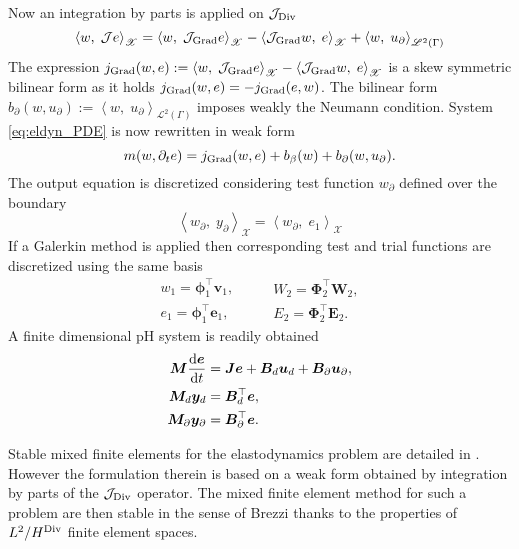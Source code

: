 Now an integration by parts is applied on $\mathcal{J}_{\operatorname*{Div}}$
\begin{equation}
\left\langle w, \; \mathcal{J} e \right\rangle_{\mathscr{X}} = \left\langle w, \; \mathcal{J}_{\operatorname*{Grad}} e \right\rangle_{\mathscr{X}} - \left\langle \mathcal{J}_{\operatorname*{Grad}} w, \; e \right\rangle_{\mathscr{X}} + \left\langle w, \; u_\partial \right\rangle_{\mathscr{L}^2(\Gamma)}
\end{equation}
The expression $j_{\operatorname*{Grad}}(w, e) :=\left\langle w, \; \mathcal{J}_{\operatorname*{Grad}} e \right\rangle_{\mathscr{X}} - \left\langle \mathcal{J}_{\operatorname*{Grad}} w, \; e \right\rangle_{\mathscr{X}}$ is a skew symmetric bilinear form as it holds $j_{\operatorname*{Grad}}(w, e)=-j_{\operatorname*{Grad}}(e, w)$. The bilinear form $b_{\partial}(w, u_\partial) := \left\langle w, \; u_\partial \right\rangle_{\mathscr{L}^2(\Gamma)}$ imposes weakly the Neumann condition. System \eqref{eq:eldyn_PDE} is now rewritten in weak form
\begin{equation}
m(w, \partial_t e) = j_{\operatorname*{Grad}}(w, e) + b_\beta(w) + b_{\partial}(w, u_\partial).
\end{equation}
The output equation is discretized considering test function $w_\partial$ defined over the boundary
\begin{equation}
\left\langle w_\partial, \; y_\partial \right\rangle_{\mathscr{X}} = \left\langle w_\partial, \; e_1 \right\rangle_{\mathscr{X}}
\end{equation}
If a Galerkin method is applied then corresponding test and trial functions are discretized using the same basis
\begin{equation*}
\begin{aligned}
w_1 = \bm{\phi}_1^\top \bm{v}_1, \\
e_1 = \bm{\phi}_1^\top \bm{e}_1, 
\end{aligned} \qquad
\begin{aligned}
W_2 = \bm{\Phi}_2^\top \bm{W}_2, \\
E_2 = \bm{\Phi}_2^\top \bm{E}_2. 
\end{aligned}
\end{equation*}
A finite dimensional pH system is readily obtained
\begin{equation}
\begin{aligned}
\bm{M} \diff{\bm{e}}{t} &= \bm{J e} + \bm{B}_d \bm{u}_d + \bm{B}_\partial \bm{u}_\partial, \\
\bm{M}_d \bm{y}_d &= \bm{B}_d^\top \bm{e},  \\
\bm{M}_\partial \bm{y}_\partial &= \bm{B}_\partial^\top \bm{e}.
\end{aligned}
\end{equation}
\begin{remark}
Stable mixed finite elements for the elastodynamics problem are detailed in \cite{ArnoldElasDyn}. However the formulation therein is based on a weak form obtained by integration by parts of the $\mathcal{J}_{\operatorname*{Div}}$ operator. The mixed finite element method for such a problem are then stable in the sense of Brezzi thanks to the properties of $L^2 / H^{\operatorname*{Div}}$ finite element spaces.
\end{remark}

